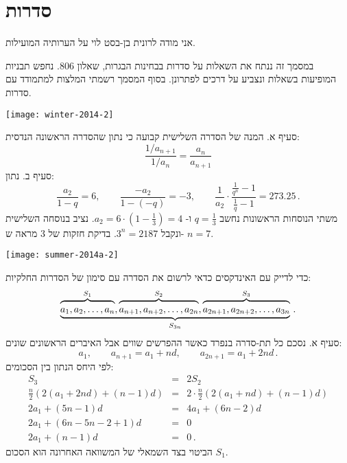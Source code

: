 
\chapter{סדרות}


אני מודה לרונית בן-בסט לוי על הערותיה המועילות.


במסמך זה ננתח את השאלות על סדרות בבחינות הבגרות, שאלון
$806$.
נחפש תבניות המופיעות בשאלות ונצביע על דרכים לפתרונן. בסוף המסמך רשמתי המלצות למתמודד עם סדרות.




\textbf{}
\begin{center}
\texttt{[image: winter-2014-2]}
\end{center}
\vspace{-2ex}
סעיף א. המנה של הסדרה השלישית קבועה כי נתון שהסדרה הראשונה הנדסית:
\[
\frac{1/a_{n+1}}{1/a_n}=\frac{a_n}{a_{n+1}}
\]
סעיף ב. נתון:
\[
\frac{a_2}{1-q}=6,\quad\quad \frac{-a_2}{1-(-q)}= -3,\quad\quad \frac{1}{a_2}\cdot\frac{\displaystyle\frac{1}{q^n}-1}{\displaystyle\frac{1}{q}-1}=273.25\,.
\]
משתי הנוסחות הראשונות נחשב
$q=\frac{1}{3}$
ו-%
$a_2=6\cdot \left(1-\frac{1}{3}\right)=4$.
נציב בנוסחה השלישית ונקבל
$3^n=2187$.
בדיקת חזקות של
$3$
מראה ש-%
$n=7$.

\bigskip

\textbf{}

\begin{center}
\texttt{[image: summer-2014a-2]}
\end{center}

כדי לדייק עם האינדקסים כדאי לרשום את הסדרה עם סימון של הסדרות החלקיות:
\[
\underbrace{
\overbrace{\rule{0pt}{8pt}a_1, a_2, \ldots, a_n}^{S_1},
\overbrace{\rule{0pt}{8pt}a_{n+1}, a_{n+2}, \ldots, a_{2n}}^{S_2},
\overbrace{\rule{0pt}{8pt}a_{2n+1}, a_{2n+2}, \ldots, a_{3n}}^{S_3}
}_{S_{3n}}\,.
\]
סעיף א. נסכם כל תת-סדרה בנפרד כאשר ההפרשים שווים אבל האיברים הראשונים שונים:
\[
a_1,\quad\quad a_{n+1} = a_1 + nd, \quad\quad a_{2n+1} = a_1 + 2nd\,.
\]
לפי היחס הנתון בין הסכומים:
\[
\renewcommand{\arraystretch}{1.2}
\begin{array}{lll}
S_3&=&2S_2\\
\frac{n}{2}(2(a_1+2nd)+(n-1)d)&=&2\cdot \frac{n}{2}(2(a_1+nd)+(n-1)d)\\
2a_1+(5n-1)d&=&4a_1+(6n-2)d\\
2a_1+(6n-5n-2+1)d&=&0\\
2a_1+(n-1)d&=&0\,.
\end{array}
\]
הביטוי בצד השמאלי של המשוואה האחרונה הוא הסכום 
$S_1$.

